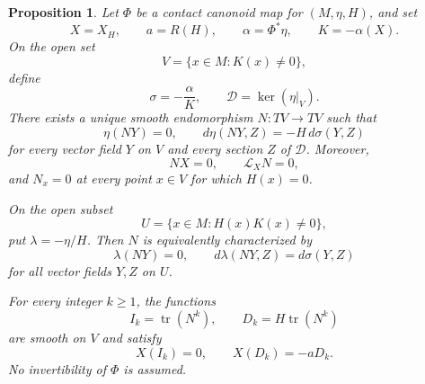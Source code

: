 \documentclass[10pt,a4paper]{amsart}
\numberwithin{equation}{section}
\newtheorem{proposition}{Proposition}
\begin{document}
\begin{proposition}
\label{prop:tensor}
Let $\Phi$ be a contact canonoid map for $(M,\eta,H)$, and set
\[
X=X_H,\qquad a=R(H),\qquad
\alpha=\Phi^*\eta,\qquad K=-\alpha(X).
\]
On the open set
\[
V=\{x\in M:K(x)\neq0\},
\]
define
\[
\sigma=-\frac{\alpha}{K},
\qquad
\mathcal D=\ker(\eta|_V).
\]
There exists a unique smooth endomorphism $N:TV\to TV$ such that
\[
\eta(NY)=0,
\qquad
d\eta(NY,Z)=-H\,d\sigma(Y,Z)
\]
for every vector field $Y$ on $V$ and every section $Z$ of
$\mathcal D$. Moreover,
\[
NX=0,\qquad \mathcal L_XN=0,
\]
and $N_x=0$ at every point $x\in V$ for which $H(x)=0$.

On the open subset
\[
U=\{x\in M:H(x)K(x)\neq0\},
\]
put $\lambda=-\eta/H$. Then $N$ is equivalently characterized by
\[
\lambda(NY)=0,
\qquad
d\lambda(NY,Z)=d\sigma(Y,Z)
\]
for all vector fields $Y,Z$ on $U$.

For every integer $k\geq1$, the functions
\[
I_k=\operatorname{tr}(N^k),
\qquad
D_k=H\operatorname{tr}(N^k)
\]
are smooth on $V$ and satisfy
\[
X(I_k)=0,\qquad X(D_k)=-aD_k.
\]
No invertibility of $\Phi$ is assumed.
\end{proposition}
\end{document}
